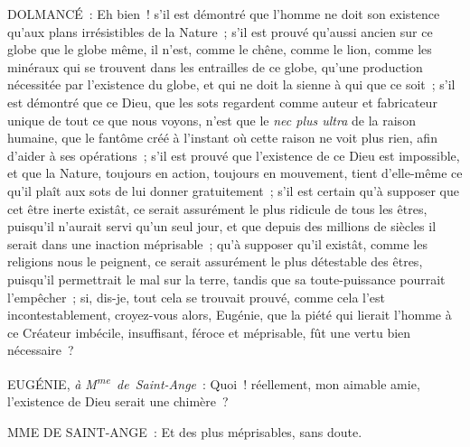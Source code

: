 \documentclass[french,twoside]{book} %
\begin{document}
DOLMANCÉ : Eh bien ! s’il est démontré que l’homme ne doit son existence qu’aux plans irrésistibles de la Nature ; s’il est prouvé qu’aussi ancien sur ce globe que le globe même, il n’est, comme le chêne, comme le lion, comme les minéraux qui se trouvent dans les entrailles de ce globe, qu’une production nécessitée par l’existence du globe, et qui ne doit la sienne à qui que ce soit ; s’il est démontré que ce Dieu, que les sots regardent comme auteur et fabricateur unique de tout ce que nous voyons, n’est que le {\itshape nec plus ultra} de la raison humaine, que le fantôme créé à l’instant où cette raison ne voit plus rien, afin d’aider à ses opérations ; s’il est prouvé que l’existence de ce Dieu est impossible, et que la Nature, toujours en action, toujours en mouvement, tient d’elle-même ce qu’il plaît aux sots de lui donner gratuitement ; s’il est certain qu’à supposer que cet être inerte existât, ce serait assurément le plus ridicule de tous les êtres, puisqu’il n’aurait servi qu’un seul jour, et que depuis des millions de siècles il serait dans une inaction méprisable ; qu’à supposer qu’il existât, comme les religions nous le peignent, ce serait assurément le plus détestable des êtres, puisqu’il permettrait le mal sur la terre, tandis que sa toute-puissance pourrait l’empêcher ; si, dis-je, tout cela se trouvait prouvé, comme cela l’est incontestablement, croyez-vous alors, Eugénie, que la piété qui lierait l’homme à ce Créateur imbécile, insuffisant, féroce et méprisable, fût une vertu bien nécessaire ?\par
EUGÉNIE, {\itshape à M\textsuperscript{me} de Saint-Ange} : Quoi ! réellement, mon aimable amie, l’existence de Dieu serait une chimère ?\par
MME DE SAINT-ANGE : Et des plus méprisables, sans doute.\par
\end{document}
